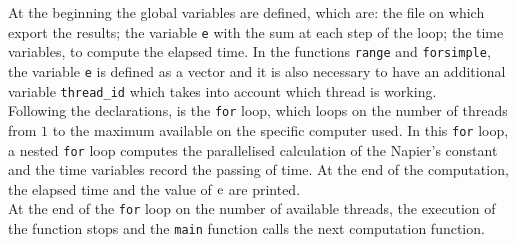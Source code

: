 \documentclass[11pt,a4paper]{article}
\begin{document}
At the beginning the global variables are defined, which are: the file on which export the results; the variable \verb+e+ with the sum at each step of the loop; the time variables, to compute the elapsed time.
In the functions \verb+range+ and \verb+forsimple+, the variable \verb+e+ is defined as a vector and it is also necessary to have an additional variable \verb+thread_id+ which takes into account which thread is working.\\
Following the declarations, is the \verb+for+ loop, which loops on the number of threads from $1$ to the maximum available on the specific computer used.
In this \verb+for+ loop, a nested \verb+for+ loop computes the parallelised calculation of the Napier's constant and the time variables record the passing of time.
At the end of the computation, the elapsed time and the value of $\operatorname{e}$ are printed.\\
At the end of the \verb+for+ loop on the number of available threads, the execution of the function stops and the \verb+main+ function calls the next computation function.
\end{document}
